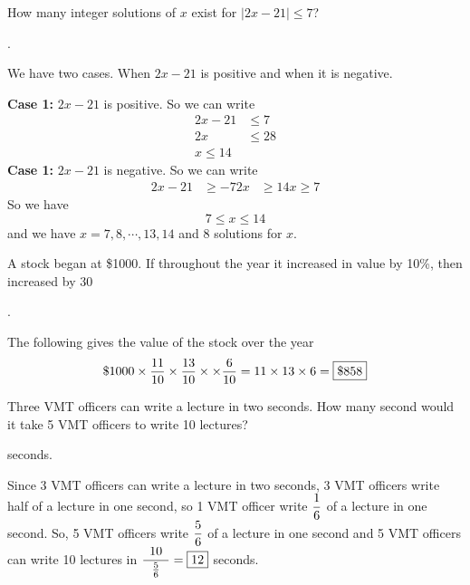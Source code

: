 \documentclass[11pt]{article}
\DeclareRobustCommand{\frac}[3][0pt]{%
  {\begingroup\hspace{#1}#2\hspace{#1}\endgroup\over\hspace{#1}#3\hspace{#1}}}
\begin{document}
\begin{problem}
How many integer solutions of $x$ exist for $\left| 2x-21 \right| \leq 7$?
\end{problem}
\begin{answer}
.
\end{answer}
\begin{solution}
We have two cases. When $2x-21$ is positive and when it is negative. \par
\textbf{Case 1:} $2x-21$ is positive.
So we can write
\begin{align*}
2x-21 &\leq 7 \\
2x &\leq 28 \\
x \leq 14
\end{align*}
\textbf{Case 1:} $2x-21$ is negative.
So we can write
\begin{align*}
2x-21 &\geq -7
2x &\geq 14
x \geq 7
\end{align*}
So we have
$$7 \leq x \leq 14$$
and we have $x = 7, 8, \cdots, 13, 14$ and $\boxed{8}$ solutions for $x$.
\end{solution}

\begin{problem}
A stock began at \$1000. If throughout the year it increased in value by 10\%, then increased by 30%
\end{problem}
\begin{answer}
. 
\end{answer}
\begin{solution}
The following gives the value of the stock over the year
$$ \$1000 \times \frac{11}{10} \times \frac{13}{10} \times \times \frac{6}{10} = 11 \times 13 \times 6 = \boxed{\$858}$$
\end{solution}


\begin{problem}Three VMT officers can write a lecture in two seconds. How many second would it take 5 VMT officers to write 10 lectures?
\end{problem}

\begin{answer}  seconds. \end{answer}
\begin{solution}
Since 3 VMT officers can write a lecture in two seconds, 3 VMT officers write half of a lecture in one second, so 1 VMT officer write $\displaystyle \frac{1}{6}$ of a lecture in one second. So, 5 VMT officers write $\displaystyle \frac{5}{6}$ of a lecture in one second and 5 VMT officers can write 10 lectures in $\displaystyle \frac[5pt]{10}{\frac{5}{6}} = \boxed{12}$ seconds.
\end{solution}
\end{document}

